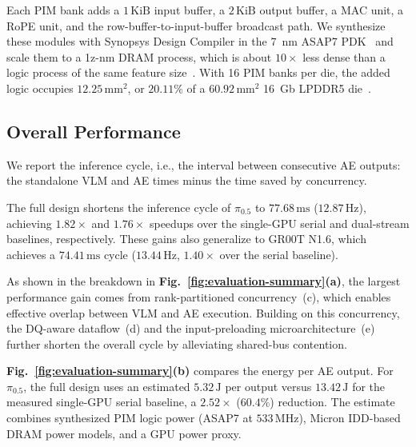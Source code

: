 Each PIM bank adds a $1\,\mathrm{KiB}$ input buffer, a $2\,\mathrm{KiB}$ output buffer, a MAC unit, a RoPE unit, and the row-buffer-to-input-buffer broadcast path. We synthesize these modules with Synopsys Design Compiler in the 7~nm ASAP7 PDK~\cite{asap7} and scale them to a 1z-nm DRAM process, which is about $10\times$ less dense than a logic process of the same feature size~\cite{attacc}. With 16 PIM banks per die, the added logic occupies $12.25\,\mathrm{mm}^{2}$, or $20.11\%$ of a $60.92\,\mathrm{mm}^{2}$ 16~Gb LPDDR5 die~\cite{lp_spec}.

\subsection{Overall Performance}
\label{sec:evaluation-b}
We report the inference cycle, i.e., the interval between consecutive AE outputs: the standalone VLM and AE times minus the time saved by concurrency.

The full \sys{} design shortens the inference cycle of $\pi_{0.5}$ to $77.68\,\mathrm{ms}$ ($12.87\,\mathrm{Hz}$), achieving $1.82\times$ and $1.76\times$ speedups over the single-GPU serial and dual-stream baselines, respectively.
These gains also generalize to GR00T N1.6, which achieves a $74.41\,\mathrm{ms}$ cycle ($13.44\,\mathrm{Hz}$, $1.40\times$ over the serial baseline).

As shown in the breakdown in \textbf{Fig.~\ref{fig:evaluation-summary}(a)}, the largest performance gain comes from rank-partitioned concurrency~(c), which enables effective overlap between VLM and AE execution.
Building on this concurrency, the DQ-aware dataflow~(d) and the input-preloading microarchitecture~(e) further shorten the overall cycle by alleviating shared-bus contention.

\textbf{Fig.~\ref{fig:evaluation-summary}(b)} compares the energy per AE output. For $\pi_{0.5}$, the full design uses an estimated $5.32\,\mathrm{J}$ per output versus $13.42\,\mathrm{J}$ for the measured single-GPU serial baseline, a $2.52\times$ ($60.4\%$) reduction. The estimate combines synthesized PIM logic power (ASAP7 at $533\,\mathrm{MHz}$), Micron IDD-based DRAM power models, and a GPU power proxy.

